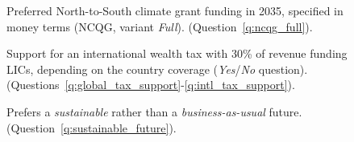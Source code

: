 \begin{figure}[h!]
    \caption[Preferred NCQG, variant \textit{Full}]{Preferred North-to-South climate grant funding in 2035, specified in money terms (NCQG, variant \textit{Full}). (Question~\ref{q:ncqg_full}).
    }\label{fig:ncqg_full}
\end{figure}

\begin{figure}[h!]
    \caption[Support for an international wealth depending on country coverage]{Support for an international wealth tax with 30\% of revenue funding LICs, depending on the country coverage (\textit{Yes}/\textit{No} question). (Questions~\ref{q:global_tax_support}-\ref{q:intl_tax_support}).
    }\label{fig:wealth_tax_heatmap}
\end{figure}

\begin{figure}[h!]
    \caption[Prefers a sustainable future]{Prefers a \textit{sustainable} rather than a \textit{business-as-usual} future. (Question~\ref{q:sustainable_future}).
    }\label{fig:sustainable_future}
\end{figure}

